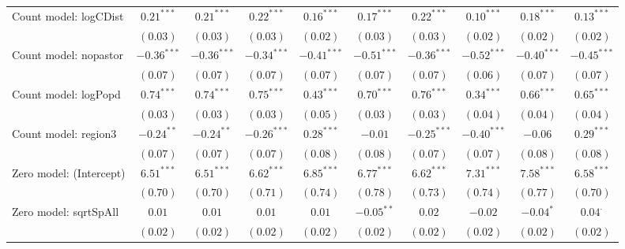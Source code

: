 \begin{table}
\begin{center}
{\begin{tabular}{l c c c c c c c c c}
Count model: logCDist          & $0.21^{***}$   & $0.21^{***}$   & $0.22^{***}$   & $0.16^{***}$    & $0.17^{***}$   & $0.22^{***}$    & $0.10^{***}$    & $0.18^{***}$    & $0.13^{***}$   \\
                               & $(0.03)$       & $(0.03)$       & $(0.03)$       & $(0.02)$        & $(0.03)$       & $(0.03)$        & $(0.02)$        & $(0.02)$        & $(0.02)$       \\
Count model: nopastor          & $-0.36^{***}$  & $-0.36^{***}$  & $-0.34^{***}$  & $-0.41^{***}$   & $-0.51^{***}$  & $-0.36^{***}$   & $-0.52^{***}$   & $-0.40^{***}$   & $-0.45^{***}$  \\
                               & $(0.07)$       & $(0.07)$       & $(0.07)$       & $(0.07)$        & $(0.07)$       & $(0.07)$        & $(0.06)$        & $(0.07)$        & $(0.07)$       \\
Count model: logPopd           & $0.74^{***}$   & $0.74^{***}$   & $0.75^{***}$   & $0.43^{***}$    & $0.70^{***}$   & $0.76^{***}$    & $0.34^{***}$    & $0.66^{***}$    & $0.65^{***}$   \\
                               & $(0.03)$       & $(0.03)$       & $(0.03)$       & $(0.05)$        & $(0.03)$       & $(0.03)$        & $(0.04)$        & $(0.04)$        & $(0.04)$       \\
Count model: region3           & $-0.24^{**}$   & $-0.24^{**}$   & $-0.26^{***}$  & $0.28^{***}$    & $-0.01$        & $-0.25^{***}$   & $-0.40^{***}$   & $-0.06$         & $0.29^{***}$   \\
                               & $(0.07)$       & $(0.07)$       & $(0.07)$       & $(0.08)$        & $(0.08)$       & $(0.07)$        & $(0.07)$        & $(0.08)$        & $(0.08)$       \\
Zero model: (Intercept)        & $6.51^{***}$   & $6.51^{***}$   & $6.62^{***}$   & $6.85^{***}$    & $6.77^{***}$   & $6.62^{***}$    & $7.31^{***}$    & $7.58^{***}$    & $6.58^{***}$   \\
                               & $(0.70)$       & $(0.70)$       & $(0.71)$       & $(0.74)$        & $(0.78)$       & $(0.73)$        & $(0.74)$        & $(0.77)$        & $(0.70)$       \\
Zero model: sqrtSpAll          & $0.01$         & $0.01$         & $0.01$         & $0.01$          & $-0.05^{**}$   & $0.02$          & $-0.02$         & $-0.04^{*}$     & $0.04^{\cdot}$ \\
                               & $(0.02)$       & $(0.02)$       & $(0.02)$       & $(0.02)$        & $(0.02)$       & $(0.02)$        & $(0.02)$        & $(0.02)$        & $(0.02)$       \\

\end{tabular}}
\end{center}
\end{table}
